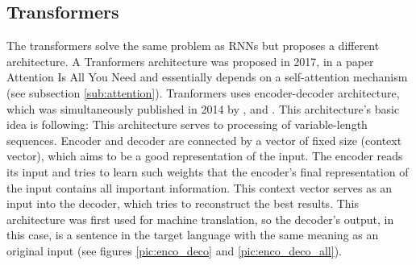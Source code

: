 \subsection{Transformers}
\label{sub:transformers}
The transformers solve the same problem as RNNs but proposes a different architecture. A Tranformers architecture was proposed in 2017, in a paper Attention Is All You Need \citep{Vaswani2017} and essentially depends on a self-attention mechanism (see subsection \ref{sub:attention}). %
Tranformers uses encoder-decoder architecture, which was simultaneously published in 2014 by \citep{Cho2014}, \citep{Sutskever2014} and \citep{Wu2016}. This architecture's basic idea is following: 
This architecture serves to processing of variable-length sequences. Encoder and decoder are connected by a vector of fixed size (context vector), which aims to be a good representation of the input. %
The encoder reads its input and tries to learn such weights that the encoder's final representation of the input contains all important information. This context vector serves as an input into the decoder, which tries to reconstruct the best results. This architecture was first used for machine translation, so the decoder's output, in this case, is a sentence in the target language with the same meaning as an original input (see figures \ref{pic:enco_deco}  and \ref{pic:enco_deco_all}).
